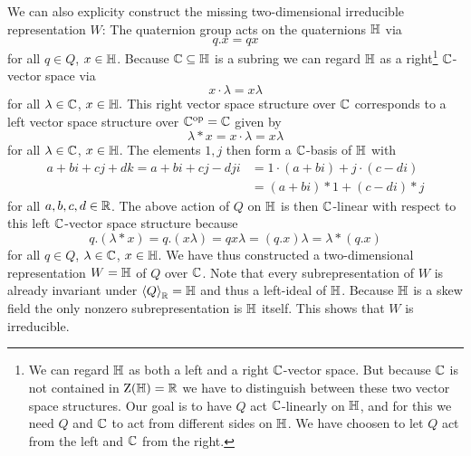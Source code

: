 \begin{example}
  We can also explicity construct the missing two-dimensional irreducible representation $W$:
  The quaternion group acts on the quaternions $\mathbb{H}$ via
  \[
      q.x
    = qx
  \]
  for all $q \in Q$, $x \in \mathbb{H}$.
  Because $\mathbb{C} \subseteq \mathbb{H}$ is a subring we can regard $\mathbb{H}$ as a right\footnote{
  We can regard $\mathbb{H}$ as both a left and a right $\mathbb{C}$-vector space.
  But because $\mathbb{C}$ is not contained in $\operatorname{Z}(\mathbb{H}) = \mathbb{R}$ we have to distinguish between these two vector space structures.
  Our goal is to have $Q$ act $\mathbb{C}$-linearly on $\mathbb{H}$, and for this we need $Q$ and $\mathbb{C}$ to act from different sides on $\mathbb{H}$.
  We have choosen to let $Q$ act from the left and $\mathbb{C}$ from the right.
  }
  $\mathbb{C}$-vector space via
  \[
      x \cdot \lambda
    = x \lambda
  \]
  for all $\lambda \in \mathbb{C}$, $x \in \mathbb{H}.$
  This right vector space structure over $\mathbb{C}$ corresponds to a left vector space structure over $\mathbb{C}^{\operatorname{op}} = \mathbb{C}$ given by
  \[
      \lambda * x
    = x \cdot \lambda
    = x \lambda
  \]
  for all $\lambda \in \mathbb{C}$, $x \in \mathbb{H}$.
  The elements $1, j$ then form a $\mathbb{C}$-basis of $\mathbb{H}$ with
  \begin{align*}
        a + bi + cj + dk
     =  a + bi + cj - dji
    &=  1 \cdot (a + bi) + j \cdot (c - di) \\
    &=  (a + bi) * 1 + (c - di) * j
  \end{align*}
  for all $a, b, c, d \in \mathbb{R}$.
  The above action of $Q$ on $\mathbb{H}$ is then $\mathbb{C}$-linear with respect to this left $\mathbb{C}$-vector space structure because
  \[
      q.(\lambda * x)
    = q.(x \lambda) 
    = q x \lambda
    = (q.x) \lambda
    = \lambda * (q.x)
  \]
  for all $q \in Q$, $\lambda \in \mathbb{C}$, $x \in \mathbb{H}$.
  We have thus constructed a two-dimensional representation $W = \mathbb{H}$ of $Q$ over $\mathbb{C}$.
  Note that every subrepresentation of $W$ is already invariant under $\left\langle Q \right\rangle_{\mathbb{R}} = \mathbb{H}$ and thus a left-ideal of $\mathbb{H}$.
  Because $\mathbb{H}$ is a skew field the only nonzero subrepresentation is $\mathbb{H}$ itself.
  This shows that $W$ is irreducible.
  

\end{example}
